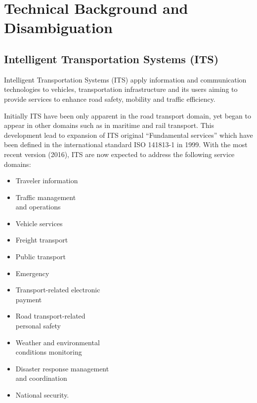 \chapter{Technical Background and Disambiguation}
\label{cha:Disambiguation}

\section{Intelligent Transportation Systems (ITS)}
Intelligent Transportation Systems (ITS) apply information and communication technologies to vehicles, transportation infrastructure and its users aiming to provide services to enhance road safety, mobility and traffic efficiency. %



Initially ITS have been only apparent in the road transport domain, yet began to appear in other domains such as in maritime and rail transport. %
This development lead to expansion of ITS original ``Fundamental services'' which have been defined in the international standard ISO 141813-1 in 1999. %
With the most recent version (2016), ITS are now expected to address the following service domains:

\begin{multicols}{2}
    \begin{itemize}
        \item Traveler information
        \item Traffic management\\and operations
        \item Vehicle services
        \item Freight transport
        \item Public transport
        \item Emergency
        \columnbreak
        \item Transport-related electronic\\payment
        \item Road transport-related\\personal safety
        \item Weather and environmental\\conditions monitoring
        \item Disaster response management\\and coordination
        \item National security.
    \end{itemize}
\end{multicols}

